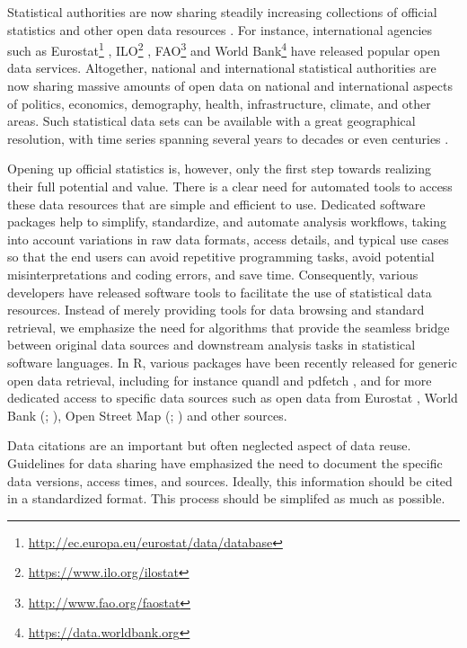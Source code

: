 Statistical authorities are now sharing steadily increasing
collections of official statistics and other open data
resources \cite{xxx}. For instance, international agencies such as
Eurostat\footnote{\url{http://ec.europa.eu/eurostat/data/database}} \cite{xxx},
ILO\footnote{\url{https://www.ilo.org/ilostat}} \cite{xxx} ,
FAO\footnote{\url{http://www.fao.org/faostat}} \cite{xxx} and World
Bank\footnote{\url{https://data.worldbank.org}} \cite{xxx} have
released popular open data services. Altogether, national and
international statistical authorities are now sharing massive amounts
of open data on national and international aspects of politics,
economics, demography, health, infrastructure, climate, and other
areas. Such statistical data sets can be available with a great
geographical resolution, with time series spanning several years to
decades or even centuries \cite{xxx}.


Opening up official statistics is, however, only the first step
towards realizing their full potential and value. There is a clear
need for automated tools to access these data resources that are
simple and efficient to use. Dedicated software packages help to
simplify, standardize, and automate analysis workflows, taking into
account variations in raw data formats, access details, and typical
use cases so that the end users can avoid repetitive programming
tasks, avoid potential misinterpretations and coding errors, and save
time. Consequently, various developers have released software tools to
facilitate the use of statistical data resources. Instead of merely
providing tools for data browsing and standard retrieval, we emphasize
the need for algorithms that provide the seamless bridge between
original data sources and downstream analysis tasks in statistical
software languages. In R, various packages have been recently released
for generic open data retrieval, including for instance
quandl \cite{quandl} and pdfetch \cite{pdfetch}, and for more
dedicated access to specific data sources such as open data from
Eurostat \cite{Lahti17eurostat}, World Bank
(; \citealt{WDI}), Open Street Map
(; \citealt{osmar}) and other sources.


Data citations are an important but often neglected aspect of data
reuse. Guidelines for data sharing have emphasized the need to
document the specific data versions, access times, and
sources. Ideally, this information should be cited in a standardized
format. This process should be simplifed as much as possible.

